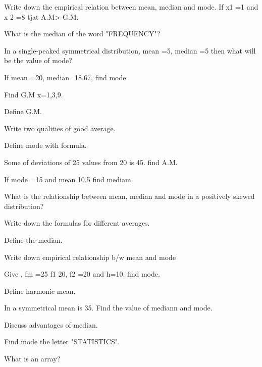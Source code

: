 \documentclass[11pt,a4paper]{article}
\begin{document}
\begin{shortlist}
\item Write down the empirical relation between mean, median and mode. If x1 =1 and x 2 =8 tjat A.M> G.M.

\item What is the median of the word "FREQUENCY"?

\item In a single-peaked symmetrical distribution, mean =5, median =5 then what will be the value of mode?

\item If mean =20, median=18.67, find mode.

\item Find G.M x=1,3,9.

\item Define G.M.

\item Write two qualities of good average.

\item Define mode with formula.

\item Some of deviations of 25 values from 20 is 45. find A.M.

\item If mode =15 and mean 10.5 find mediam.

\item What is the relationship between mean, median and mode in a positively skewed distribution?

\item Write down the formulas for different averages.

\item Define the median.

\item Write down empirical relationship b/w mean and mode

\item Give , fm =25 f1 20, f2 =20 and h=10. find mode.

\item Define harmonic mean.

\item In a symmetrical mean is 35. Find the value of mediann and mode.

\item Discuss advantages of median.

\item Find mode the letter "STATISTICS".

\item What is an array?


\end{shortlist}
\end{document}
